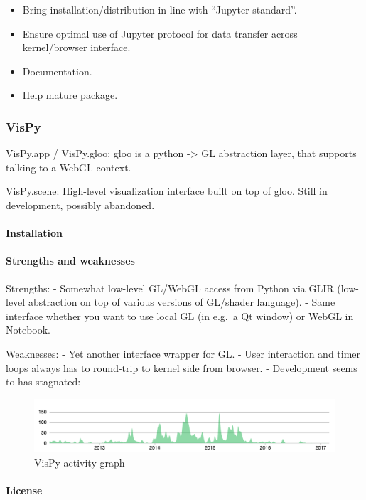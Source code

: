 \begin{itemize}
\tightlist
\item
  Bring installation/distribution in line with ``Jupyter standard''.
\item
  Ensure optimal use of Jupyter protocol for data transfer across
  kernel/browser interface.
\item
  Documentation.
\item
  Help mature package.
\end{itemize}

\subsubsection{VisPy}

VisPy.app / VisPy.gloo: gloo is a python -\textgreater{} GL abstraction
layer, that supports talking to a WebGL context.

VisPy.scene: High-level visualization interface built on top of gloo.
Still in development, possibly abandoned.

\paragraph{Installation}

\paragraph{Strengths and weaknesses}

Strengths: - Somewhat low-level GL/WebGL access from Python via GLIR
(low-level abstraction on top of various versions of GL/shader
language). - Same interface whether you want to use local GL (in e.g.~a
Qt window) or WebGL in Notebook.

Weaknesses: - Yet another interface wrapper for GL. - User interaction
and timer loops always has to round-trip to kernel side from browser. -
Development seems to has stagnated:

\begin{figure}
\centering
\includegraphics[width=0.6\paperwidth]{existing_tools/vispy_activity.pdf}
\caption{VisPy activity graph}
\end{figure}

\paragraph{License}


